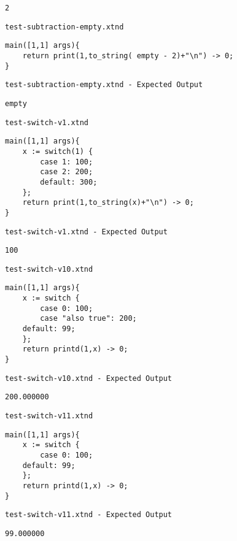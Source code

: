 \begin{lstlisting}
2
\end{lstlisting}


\medskip \noindent \texttt{test-subtraction-empty.xtnd}


\begin{lstlisting}
main([1,1] args){
	return print(1,to_string( empty - 2)+"\n") -> 0;
}
\end{lstlisting}


\medskip \noindent \texttt{test-subtraction-empty.xtnd - Expected Output}


\begin{lstlisting}
empty
\end{lstlisting}


\medskip \noindent \texttt{test-switch-v1.xtnd}


\begin{lstlisting}
main([1,1] args){
	x := switch(1) {
		case 1: 100;
		case 2: 200;
		default: 300;
	};
	return print(1,to_string(x)+"\n") -> 0;
}
\end{lstlisting}


\medskip \noindent \texttt{test-switch-v1.xtnd - Expected Output}


\begin{lstlisting}
100
\end{lstlisting}


\medskip \noindent \texttt{test-switch-v10.xtnd}


\begin{lstlisting}
main([1,1] args){
	x := switch {
		case 0: 100;
		case "also true": 200;
    default: 99;
	};
	return printd(1,x) -> 0;
}
\end{lstlisting}


\medskip \noindent \texttt{test-switch-v10.xtnd - Expected Output}


\begin{lstlisting}
200.000000
\end{lstlisting}


\medskip \noindent \texttt{test-switch-v11.xtnd}


\begin{lstlisting}
main([1,1] args){
	x := switch {
		case 0: 100;
    default: 99;
	};
	return printd(1,x) -> 0;
}
\end{lstlisting}


\medskip \noindent \texttt{test-switch-v11.xtnd - Expected Output}


\begin{lstlisting}
99.000000
\end{lstlisting}


